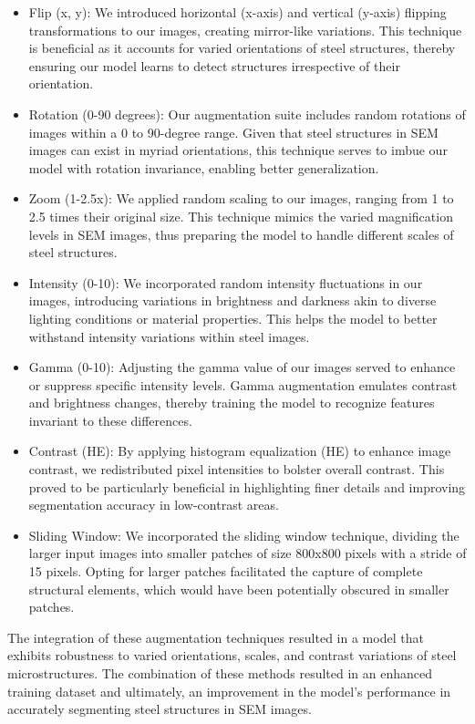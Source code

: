 \documentclass[]{article}
\begin{document}
\begin{itemize}
	\item Flip (x, y): We introduced horizontal (x-axis) and vertical (y-axis) flipping transformations to our images, creating mirror-like variations. This technique is beneficial as it accounts for varied orientations of steel structures, thereby ensuring our model learns to detect structures irrespective of their orientation.
	\item Rotation (0-90 degrees): Our augmentation suite includes random rotations of images within a 0 to 90-degree range. Given that steel structures in SEM images can exist in myriad orientations, this technique serves to imbue our model with rotation invariance, enabling better generalization.
	\item Zoom (1-2.5x): We applied random scaling to our images, ranging from 1 to 2.5 times their original size. This technique mimics the varied magnification levels in SEM images, thus preparing the model to handle different scales of steel structures.
	\item Intensity (0-10): We incorporated random intensity fluctuations in our images, introducing variations in brightness and darkness akin to diverse lighting conditions or material properties. This helps the model to better withstand intensity variations within steel images.
	\item Gamma (0-10): Adjusting the gamma value of our images served to enhance or suppress specific intensity levels. Gamma augmentation emulates contrast and brightness changes, thereby training the model to recognize features invariant to these differences.
	\item Contrast (HE): By applying histogram equalization (HE) to enhance image contrast, we redistributed pixel intensities to bolster overall contrast. This proved to be particularly beneficial in highlighting finer details and improving segmentation accuracy in low-contrast areas.
	\item Sliding Window: We incorporated the sliding window technique, dividing the larger input images into smaller patches of size 800x800 pixels with a stride of 15 pixels. Opting for larger patches facilitated the capture of complete structural elements, which would have been potentially obscured in smaller patches.
\end{itemize}

The integration of these augmentation techniques resulted in a model that exhibits robustness to varied orientations, scales, and contrast variations of steel microstructures. The combination of these methods resulted in an enhanced training dataset and ultimately, an improvement in the model's performance in accurately segmenting steel structures in SEM images.
\end{document}
